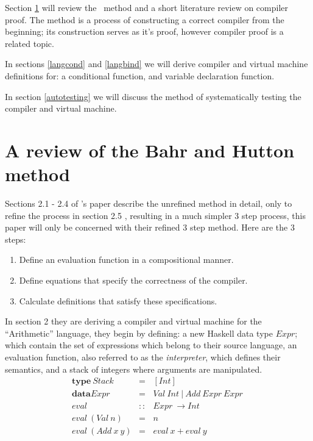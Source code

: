 \documentclass {article}
\begin{document}
Section \ref{bhrev} will review the \BH\ method 
and a short literature review on compiler
proof. The \BH method is
a process of constructing a correct 
compiler from the beginning; its construction
serves as it's proof,
however compiler proof is a related topic.

In sections \ref{langcond} and \ref{langbind}
 we will derive compiler and
virtual machine definitions for: a conditional function, 
and variable declaration function.

In section \ref{autotesting} we will discuss the method
of systematically testing the compiler and virtual machine.

\section{A review of the Bahr and Hutton method} \label{bhrev}

Sections 2.1 - 2.4 of \BH's paper describe the unrefined 
method in detail, only to refine the process
in section 2.5 \cite[2.5 Combining the transformation steps]{bandh},
resulting in a much simpler 3 step process, 
this paper will only be concerned with
their refined 3 step method\cite[page 12]{bandh}.
Here are the 3 steps:

\begin{enumerate}
	\item Define an evaluation function
		in a compositional manner.
	\item Define equations that specify
		the correctness of the compiler.
	\item Calculate definitions that 
		satisfy these specifications.
\end{enumerate}

In section 2 they are deriving a compiler
and virtual machine for the ``Arithmetic'' language,
they begin by defining: a new Haskell data type $Expr$;
which contain the set of expressions which belong to their source language,
an evaluation function, also referred to as the \emph{interpreter},
which defines their semantics,
and a stack of integers where 
arguments are manipulated.
\newcommand{\eval}{\textit{eval}}
\newcommand{\expr}{\textit{Expr}}
\newcommand{\val}{\textit{Val}}
\newcommand{\add}{\textit{Add}}
\newcommand{\code}{\textit{Code}}
\newcommand{\Val}{\mathit{Val\ }}
\newcommand{\Add}{\mathit{Add\ }}
\newcommand{\evalf}{\mathit{eval\ }}
\newcommand{\Expr}{\mathit{Expr\ }}
\newcommand{\Int}{\mathit{Int\ }}
\begin{eqnarray}
\textbf{type} \ Stack &=& [\mathit{Int}] \nonumber \\
\textbf{data} \Expr &=& \Val \Int | \ \Add \Expr \Expr \nonumber \\
\evalf &::& \Expr \rightarrow \mathit{Int} \nonumber \\ 
\evalf (\Val  n) &=& n \label{evalval}\\
\evalf (\Add  x\  y) &=& \evalf  x + \evalf  y \label{evaladd}
\end{eqnarray}
\end{document}
